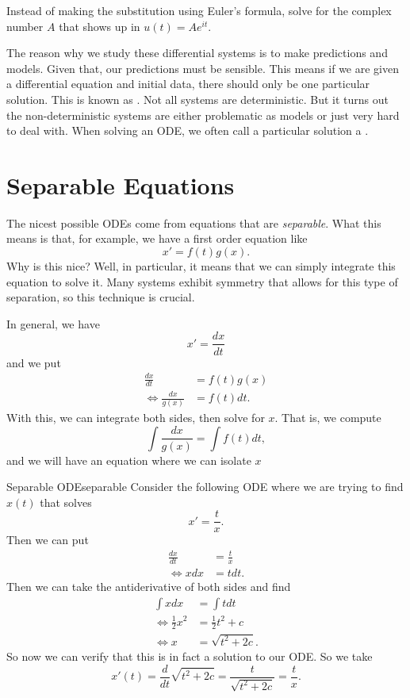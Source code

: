         \begin{exercise}
            Instead of making the substitution using Euler's formula, solve for the complex number $A$ that shows up in $u(t)=Ae^{it}$.
        \end{exercise}
        
        The reason why we study these differential systems is to make predictions and models.  Given that, our predictions must be sensible. This means if we are given a differential equation and initial data, there should only be one particular solution.  This is known as .     Not all systems are deterministic.  But it turns out the non-deterministic systems are either problematic as models or just very hard to deal with. When solving an ODE, we often call a particular solution a .
        
        \section{Separable Equations}
        The nicest possible ODEs come from equations that are \emph{separable}.  What this means is that, for example, we have a first order equation like
        \[
        x'=f(t)g(x).
        \]
        Why is this nice? Well, in particular, it means that we can simply integrate this equation to solve it.  Many systems exhibit symmetry that allows for this type of separation, so this technique is crucial.
        
        In general, we have
        \[
        x'=\frac{dx}{dt}
        \]
        and we put
        \begin{align*}
            \frac{dx}{dt}&=f(t)g(x)\\
            \iff \frac{dx}{g(x)} &= f(t)dt.
        \end{align*}
        With this, we can integrate both sides, then solve for $x$. That is, we compute
        \[
        \int \frac{dx}{g(x)} = \int f(t)dt,
        \]
        and we will have an equation where we can isolate $x$
        
        \begin{ex}{Separable ODE}{separable}
        Consider the following ODE where we are trying to find $x(t)$ that solves
        \[
        x'=\frac{t}{x}. 
        \]
        Then we can put
        \begin{align*}
            \frac{dx}{dt}&= \frac{t}{x}\\
            \iff xdx &= t dt.
        \end{align*}
        Then we can take the antiderivative of both sides and find
        \begin{align*}
            \int xdx &= \int t dt\\
            \iff \frac{1}{2}x^2 &= \frac{1}{2}t^2 + c\\
            \iff x&=\sqrt{t^2+2c}.
        \end{align*}
        So now we can verify that this is in fact a solution to our ODE.  So we take
        \[
        x'(t) = \frac{d}{dt}\sqrt{t^2+2c}= \frac{t}{\sqrt{t^2+2c}} = \frac{t}{x}.
        \]
        \end{ex}
        

